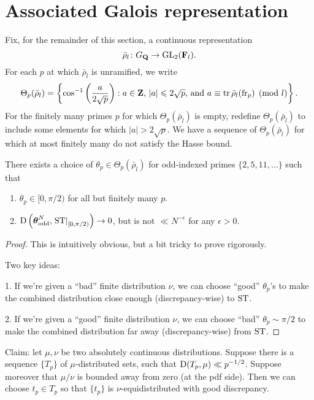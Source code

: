 \section{Associated Galois representation}



Fix, for the remainder of this section, a continuous representation 
\[
	\bar\rho_l \colon G_{\mathbf{Q}} \to \operatorname{GL}_2(\mathbf{F}_l) .
\]
For each $p$ at which $\bar\rho_l$ is unramified, we write 
\[
	\Theta_p(\bar\rho_l) = \left\{\cos^{-1}\left(\frac{a}{2\sqrt p}\right) : a\in \mathbf{Z}\text{, }|a|\leqslant 2\sqrt p\text{, and }a\equiv \operatorname{tr}\bar\rho_l(\mathrm{fr}_p)\pmod l\right\} .
\]
For the finitely many primes $p$ for which $\Theta_p(\bar\rho_l)$ is empty, 
redefine $\Theta_p(\bar\rho_l)$ to include some elements for which 
$|a|>2\sqrt p$. We have a sequence of $\Theta_p(\bar\rho_l)$ for which at most 
finitely many do not satisfy the Hasse bound. 

\begin{theorem}
There exists a choice of $\theta_p\in \Theta_p(\bar\rho_l)$ for odd-indexed 
primes $\{2,5,11,\dots\}$ such that 
\begin{enumerate}
\item
$\theta_p\in [0,\pi/2)$ for all but finitely many $p$. 

\item
$\operatorname{D}\left({\boldsymbol\theta}_{\mathrm{odd}}^N, \left.\mathrm{ST}\right|_{[0,\pi/2)}\right) \to 0$, 
but is not $\ll N^{-\epsilon}$ for any $\epsilon>0$. 
\end{enumerate}
\end{theorem}
\begin{proof}
This is intuitively obvious, but a bit tricky to prove rigorously. 

Two key ideas: 

1. If we're given a ``bad'' finite distribution $\nu$, we can choose ``good'' 
$\theta_p$'s to make the combined distribution close enough (discrepancy-wise) 
to $\mathrm{ST}$. 

2. If we're given a ``good'' finite distribution $\nu$, we can choose ``bad'' 
$\theta_p\sim \pi/2$ to make the combined distribution far away 
(discrepancy-wise) from $\mathrm{ST}$. 
\end{proof}

Claim: let $\mu,\nu$ be two absolutely continuous distributions. Suppose there 
is a sequence $\{T_p\}$ of $\mu$-distributed sets, such that 
$\operatorname{D}(T_p,\mu) \ll p^{-1/2}$. Suppose moreover that $\mu/\nu$ is bounded away 
from zero (at the pdf side). Then we can choose $t_p\in T_p$ so that 
$\{t_p\}$ is $\nu$-equidistributed with good discrepancy. 


